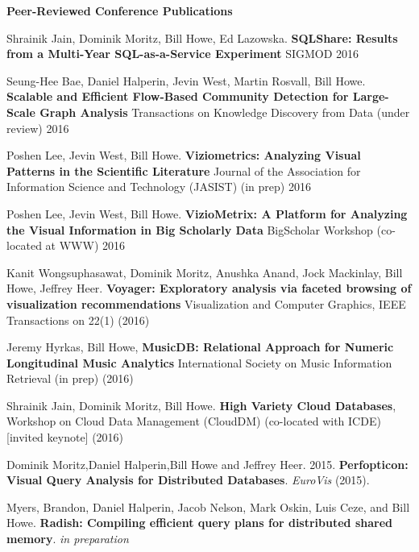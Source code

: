 
{\bf Peer-Reviewed Conference Publications}
\begin{bulletlist}

\item Shrainik Jain, Dominik Moritz, Bill Howe, Ed Lazowska. 
\textbf{SQLShare: Results from a Multi-Year SQL-as-a-Service Experiment}
SIGMOD 2016

\item Seung-Hee Bae, Daniel Halperin, Jevin West, Martin Rosvall, Bill Howe. 
\textbf{Scalable and Efficient Flow-Based Community Detection for Large-Scale Graph Analysis}
Transactions on Knowledge Discovery from Data (under review) 2016

\item Poshen Lee, Jevin West, Bill Howe. 
\textbf{Viziometrics: Analyzing Visual Patterns in the Scientific Literature}
Journal of the Association for Information Science and Technology (JASIST) (in prep) 2016

\item Poshen Lee, Jevin West, Bill Howe. 
\textbf{VizioMetrix: A Platform for Analyzing the Visual Information in Big Scholarly Data}
BigScholar Workshop (co-located at WWW) 2016

\item Kanit Wongsuphasawat, Dominik Moritz, Anushka Anand, Jock Mackinlay, Bill Howe, Jeffrey Heer. 
\textbf{Voyager: Exploratory analysis via faceted browsing of visualization recommendations}
Visualization and Computer Graphics, IEEE Transactions on 22(1) (2016)

\item  Jeremy Hyrkas, Bill Howe, \textbf{MusicDB: Relational Approach for Numeric Longitudinal Music Analytics}
International Society on Music Information Retrieval (in prep) (2016)

\item  Shrainik Jain, Dominik Moritz, Bill Howe. \textbf{High Variety Cloud Databases},  
Workshop on Cloud Data Management (CloudDM) (co-located with ICDE) [invited keynote] (2016)

\item Dominik Moritz,Daniel Halperin,Bill Howe and Jeffrey Heer. 2015.
\textbf{Perfopticon: Visual Query Analysis for Distributed Databases}.
\emph{EuroVis} (2015).

\item Myers, Brandon,
Daniel Halperin, Jacob Nelson, Mark Oskin, Luis Ceze, and Bill Howe.
\textbf{Radish: Compiling efficient query plans for distributed shared memory}.
\emph{in preparation}


\end{bulletlist}
